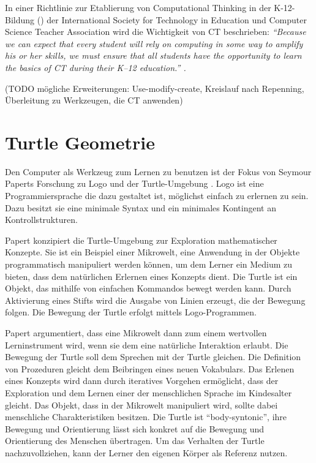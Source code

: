 In einer Richtlinie zur Etablierung von Computational Thinking in der K-12-Bildung
(\cite{leadership_toolkit}) der International Society for Technology in Education und Computer
Science Teacher Association wird die Wichtigkeit von CT beschrieben: \em \enquote{Because we can
expect that every student will rely on computing in some way to amplify his or her skills, we must
ensure that all students have the opportunity to learn the basics of CT during their K–12
education.} \em.

(TODO mögliche Erweiterungen: Use-modify-create, Kreislauf nach Repenning, Überleitung zu
Werkzeugen, die CT anwenden)

\section{Turtle Geometrie}

Den Computer als Werkzeug zum Lernen zu benutzen ist der Fokus von Seymour Paperts Forschung zu Logo
und der Turtle-Umgebung \cite{papert1980mindstorms}. Logo ist eine Programmiersprache die dazu
gestaltet ist, möglichst einfach zu erlernen zu sein. Dazu besitzt sie eine minimale Syntax und ein
minimales Kontingent an Kontrollstrukturen.

Papert konzipiert die Turtle-Umgebung zur Exploration mathematischer Konzepte. Sie ist ein Beispiel
einer Mikrowelt, eine Anwendung in der Objekte programmatisch manipuliert werden können, um dem
Lerner ein Medium zu bieten, dass dem natürlichen Erlernen eines Konzepts dient. Die Turtle ist ein
Objekt, das mithilfe von einfachen Kommandos bewegt werden kann. Durch Aktivierung eines Stifts wird
die Ausgabe von Linien erzeugt, die der Bewegung folgen. Die Bewegung der Turtle erfolgt mittels
Logo-Programmen.

Papert argumentiert, dass eine Mikrowelt dann zum einem wertvollen Lerninstrument wird, wenn sie dem
eine natürliche Interaktion erlaubt. Die Bewegung der Turtle soll dem Sprechen mit der Turtle
gleichen. Die Definition von Prozeduren gleicht dem Beibringen eines neuen Vokabulars. Das Erlenen
eines Konzepts wird dann durch iteratives Vorgehen ermöglicht, dass der Exploration und dem Lernen
einer der menschlichen Sprache im Kindesalter gleicht. Das Objekt, dass in der Mikrowelt manipuliert
wird, sollte dabei menschliche Charakteristiken besitzen. Die Turtle ist \enquote{body-syntonic},
ihre Bewegung und Orientierung lässt sich konkret auf die Bewegung und Orientierung des Menschen
übertragen. Um das Verhalten der Turtle nachzuvollziehen, kann der Lerner den eigenen Körper als
Referenz nutzen.


